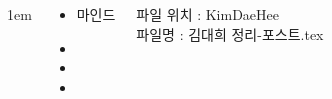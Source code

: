 \documentclass[	20pt, 
							a0paper, 
							landscape,
							margin=0mm, %
							innermargin=10mm,  		%
							blockverticalspace=4mm, %
							colspace=5mm, 
							subcolspace=0mm
							]{tikzposter}
\begin{document}
\begin{columns}

			{
					\setlength{\leftmargini}{3em}
					\setlength{\labelsep} {1em}
				\begin{LARGE}
					\begin{itemize}
					\item 마인드 
					\item 
					\item 
					\item 
					\end{itemize}
				\end{LARGE}
파일 위치 : KimDaeHee\\
파일명 : 김대희 정리-포스트.tex
			} %






	\end{columns}
\end{document}
